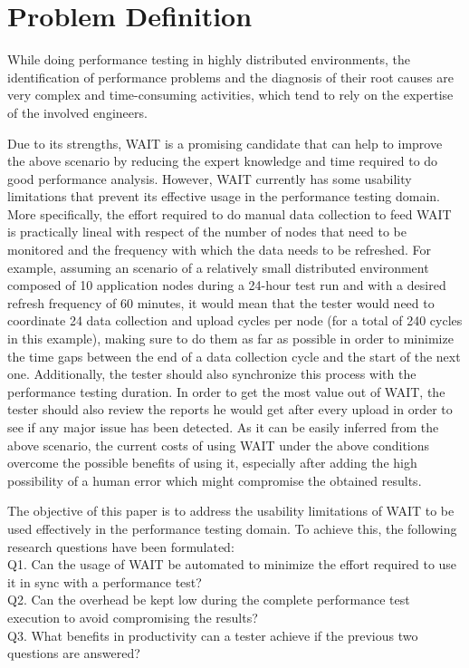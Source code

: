 \documentclass[runningheads,a4paper]{llncs}
\begin{document}

\section{Problem Definition}

While doing performance testing in highly distributed environments, the
identification of performance problems and the diagnosis of their root causes are very complex and time-consuming
activities, which tend to rely on the expertise of the involved engineers.

Due to its strengths, WAIT is a promising candidate that can help to improve the
above scenario by reducing the expert knowledge and time required to do good
performance analysis. However, WAIT currently has some usability limitations
that prevent its effective usage in the performance testing domain. More
specifically, the effort required to do manual data collection to feed WAIT is
practically lineal with respect of the number of nodes that need to be monitored
and the frequency with which the data needs to be refreshed. For example,
assuming an scenario of a relatively small distributed environment composed
of 10 application nodes during a 24-hour test run and with a desired refresh
frequency of 60 minutes, it would mean that the tester would need to coordinate 
24 data collection and upload cycles per node (for a total of 240
cycles in this example), making sure to do them as far as possible in order to
minimize the time gaps between the end of a data collection cycle and the
start of the next one. Additionally, the tester should also synchronize this
process with the performance testing duration. In order to get the most value
out of WAIT, the tester should also review the reports he would get after every 
upload in order to see if any major issue has been detected. As it can be easily inferred from
the above scenario, the current costs of using WAIT under the above conditions
overcome the possible benefits of using it, especially after adding the high
possibility of a human error which might compromise the obtained results.

The objective of this paper is to address the usability limitations of WAIT to
be used effectively in the performance testing domain. To achieve this, the
following research questions have been formulated:
\\Q1. Can the usage of WAIT be automated to minimize the effort
required to use it in sync with a performance test?
\\Q2. Can the overhead be kept low during the complete performance test
execution to avoid compromising the results? 
\\Q3. What benefits in productivity can a tester achieve if the previous
two questions are answered?
\end{document}
